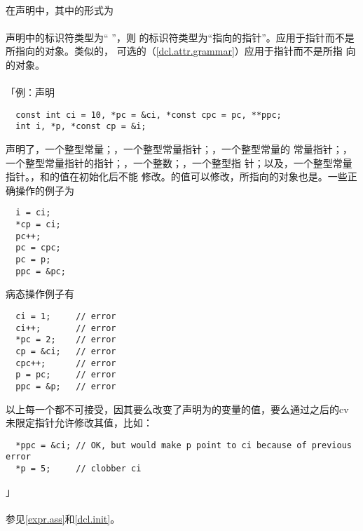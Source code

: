 \paragraph{}
在声明中，其中的形式为                                          \\
\mbox{\qquad\tm{*}  }                                        \\
声明中的标识符类型为`` ''，则
的标识符类型为``指向的指针''。应用于指针而不是所指向的对象。类似的，
可选的（\ref{dcl.attr.grammar}）应用于指针而不是所指
向的对象。

\paragraph{}
「例：声明
\begin{lstlisting}
  const int ci = 10, *pc = &ci, *const cpc = pc, **ppc;
  int i, *p, *const cp = &i;
\end{lstlisting}
声明了，一个整型常量；，一个整型常量指针；，一个整型常量的
常量指针；，一个整型常量指针的指针；，一个整数；，一个整型指
针；以及，一个整型常量指针。，和的值在初始化后不能
修改。的值可以修改，所指向的对象也是。一些正确操作的例子为
\begin{lstlisting}
  i = ci;
  *cp = ci;
  pc++;
  pc = cpc;
  pc = p;
  ppc = &pc;
\end{lstlisting}
病态操作例子有
\begin{lstlisting}
  ci = 1;     // error
  ci++;       // error
  *pc = 2;    // error
  cp = &ci;   // error
  cpc++;      // error
  p = pc;     // error
  ppc = &p;   // error
\end{lstlisting}
以上每一个都不可接受，因其要么改变了声明为的变量的值，要么通过之后的cv
未限定指针允许修改其值，比如：
\begin{lstlisting}
  *ppc = &ci; // OK, but would make p point to ci because of previous error
  *p = 5;     // clobber ci
\end{lstlisting}」

\paragraph{}
参见\ref{expr.ass}和\ref{dcl.init}。

